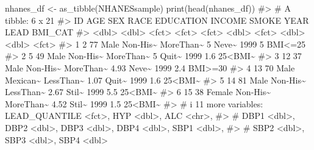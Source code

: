 \documentclass[
  letterpaper,
]{latex/krantz}
\makeatletter
\newenvironment{Shaded}{\begin{snugshade}}{\end{snugshade}}
\newcommand{\CommentTok}[1]{\textcolor[rgb]{0.37,0.37,0.37}{#1}}
\newcommand{\FunctionTok}[1]{\textcolor[rgb]{0.28,0.35,0.67}{#1}}
\newcommand{\NormalTok}[1]{\textcolor[rgb]{0.00,0.23,0.31}{#1}}
\newcommand{\OtherTok}[1]{\textcolor[rgb]{0.00,0.23,0.31}{#1}}
\newenvironment{kframe}{%
\medskip{}
\setlength{\fboxsep}{.8em}
 \def\at@end@of@kframe{}%
 \ifinner\ifhmode%
  \def\at@end@of@kframe{\end{minipage}}%
  \begin{minipage}{\columnwidth}%
 \fi\fi%
 \def\FrameCommand##1{\hskip\@totalleftmargin \hskip-\fboxsep
 \colorbox{shadecolor}{##1}\hskip-\fboxsep
     \hskip-\linewidth \hskip-\@totalleftmargin \hskip\columnwidth}%
 \MakeFramed {\advance\hsize-\width
   \@totalleftmargin\z@ \linewidth\hsize
   \@setminipage}}%
 {\par\unskip\endMakeFramed%
 \at@end@of@kframe}
\renewenvironment{Shaded}{\begin{kframe}}{\end{kframe}}
\makeatother
\begin{document}
\begin{Shaded}
\begin{Highlighting}[]
\NormalTok{nhanes\_df }\OtherTok{\textless{}{-}} \FunctionTok{as\_tibble}\NormalTok{(NHANESsample)}
\FunctionTok{print}\NormalTok{(}\FunctionTok{head}\NormalTok{(nhanes\_df))}
\CommentTok{\#\textgreater{} \# A tibble: 6 x 21}
\CommentTok{\#\textgreater{}      ID   AGE SEX    RACE     EDUCATION INCOME SMOKE  YEAR  LEAD BMI\_CAT}
\CommentTok{\#\textgreater{}   \textless{}dbl\textgreater{} \textless{}dbl\textgreater{} \textless{}fct\textgreater{}  \textless{}fct\textgreater{}    \textless{}fct\textgreater{}      \textless{}dbl\textgreater{} \textless{}fct\textgreater{} \textless{}dbl\textgreater{} \textless{}dbl\textgreater{} \textless{}fct\textgreater{}  }
\CommentTok{\#\textgreater{} 1     2    77 Male   Non{-}His\textasciitilde{} MoreThan\textasciitilde{}   5    Neve\textasciitilde{}  1999   5   BMI\textless{}=25}
\CommentTok{\#\textgreater{} 2     5    49 Male   Non{-}His\textasciitilde{} MoreThan\textasciitilde{}   5    Quit\textasciitilde{}  1999   1.6 25\textless{}BMI\textasciitilde{}}
\CommentTok{\#\textgreater{} 3    12    37 Male   Non{-}His\textasciitilde{} MoreThan\textasciitilde{}   4.93 Neve\textasciitilde{}  1999   2.4 BMI\textgreater{}=30}
\CommentTok{\#\textgreater{} 4    13    70 Male   Mexican\textasciitilde{} LessThan\textasciitilde{}   1.07 Quit\textasciitilde{}  1999   1.6 25\textless{}BMI\textasciitilde{}}
\CommentTok{\#\textgreater{} 5    14    81 Male   Non{-}His\textasciitilde{} LessThan\textasciitilde{}   2.67 Stil\textasciitilde{}  1999   5.5 25\textless{}BMI\textasciitilde{}}
\CommentTok{\#\textgreater{} 6    15    38 Female Non{-}His\textasciitilde{} MoreThan\textasciitilde{}   4.52 Stil\textasciitilde{}  1999   1.5 25\textless{}BMI\textasciitilde{}}
\CommentTok{\#\textgreater{} \# i 11 more variables: LEAD\_QUANTILE \textless{}fct\textgreater{}, HYP \textless{}dbl\textgreater{}, ALC \textless{}chr\textgreater{},}
\CommentTok{\#\textgreater{} \#   DBP1 \textless{}dbl\textgreater{}, DBP2 \textless{}dbl\textgreater{}, DBP3 \textless{}dbl\textgreater{}, DBP4 \textless{}dbl\textgreater{}, SBP1 \textless{}dbl\textgreater{},}
\CommentTok{\#\textgreater{} \#   SBP2 \textless{}dbl\textgreater{}, SBP3 \textless{}dbl\textgreater{}, SBP4 \textless{}dbl\textgreater{}}
\end{Highlighting}
\end{Shaded}
\end{document}

